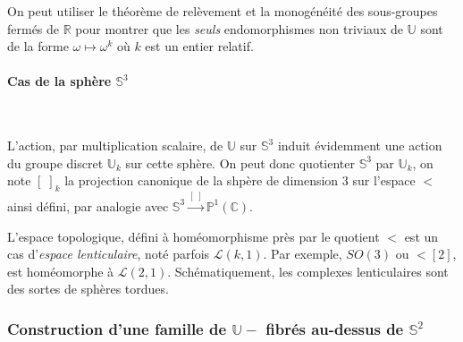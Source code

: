 \begin{rema}
On peut utiliser le th\'eor\`eme de rel\`evement et la monog\'en\'eit\'e des sous-groupes ferm\'es de $\mathbb{R}$ pour montrer que les \emph{seuls} %
endomorphismes non triviaux de $\mathbb{U}$ sont de la forme $\omega\mapsto\omega^k$ o\`u $k$ est un entier relatif.
\end{rema}

\paragraph{Cas de la sph\`ere $\mathbb{S}^3$}~\\

\par
L'action, par multiplication scalaire, de $\mathbb{U}$ sur $\mathbb{S}^3$ induit \'evidemment une action du groupe discret $\mathbb{U}_k$ sur cette sph\`ere. %
On peut donc quotienter $\mathbb{S}^3$ par $\mathbb{U}_k$, on note $[\; ]_k$ la projection canonique de la shp\`ere de dimension $3$ sur l'espace $\lt$ ainsi d\'efini, %
par analogie avec $\mathbb{S}^3\xrightarrow{[\; ]}\mathbb{P}^1(\mathbb{C})$.
\par
L'espace topologique, d\'efini \`a hom\'eomorphisme pr\`es par le quotient $\lt$ est un cas d'\emph{espace lenticulaire}, not\'e parfois $\mathcal{L}(k,1)$. %
Par exemple, $SO(3)$ ou $\lt[2]$, est hom\'eomorphe \`a $\mathcal{L}(2,1)$. Sch\'ematiquement, les complexes lenticulaires sont des sortes de \og{}sph\`eres tordues\fg{}.

\subsubsection{Construction d'une famille de $\mathbb{U}-$ fibr\'es au-dessus de $\mathbb{S}^2$}\label{lt1}

